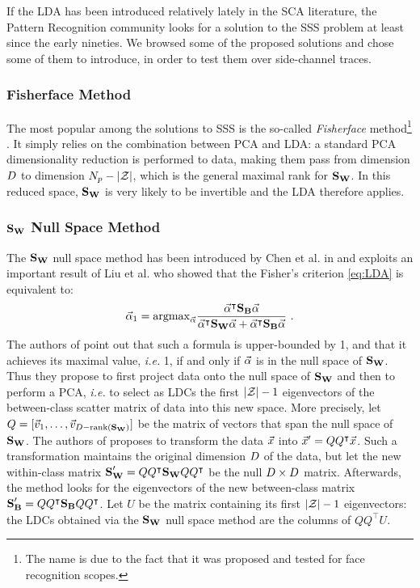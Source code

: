 If the LDA has been introduced relatively lately in the SCA literature, the Pattern Recognition community looks for a solution to the SSS problem at least since the early nineties. We browsed some of the proposed solutions and chose some of them to introduce, in order to test them over side-channel traces.

\subsubsection{Fisherface Method}
The most popular among the solutions to SSS is the so-called {\em Fisherface} method\footnote{The name is due to the fact that it was proposed and tested for face recognition scopes.} \cite{eigenfaces}. It simply relies on the combination between PCA and LDA: a standard PCA dimensionality reduction is performed to data, making them pass from dimension $D$ to dimension $N_p-\lvert\mathcal{Z}\rvert$, which is the general maximal rank for $\textbf{S}_{\textbf{W}}$. In this reduced space, $\textbf{S}_{\textbf{W}}$ is very likely to be invertible and the LDA therefore applies.

\subsubsection{$\textbf{S}_{\textbf{W}}$ Null Space Method}
The $\textbf{S}_{\textbf{W}}$ null space method has been introduced by Chen et al. in \cite{Chen2000} and exploits an important result of Liu et al. \cite{liu1992generalized} who showed that the Fisher's criterion \eqref{eq:LDA} is equivalent to:
 \begin{equation}
 \vec{\alpha}_1=\mathrm{argmax}_{\vec{\alpha}} \frac{\vec{\alpha}^\intercal \textbf{S}_{\textbf{B}} \vec{\alpha}}{\vec{\alpha}^\intercal \textbf{S}_{\textbf{W}} \vec{\alpha} + \vec{\alpha}^\intercal \textbf{S}_{\textbf{B}} \vec{\alpha}} \mbox{ .}
 \end{equation}
The authors of \cite{Chen2000} point out that such a formula is upper-bounded by 1, and that it achieves its maximal value, \textit{i.e.} 1, if and only if  $\vec{\alpha}$ is in the null space of $\textbf{S}_{\textbf{W}}$. Thus they propose to first project data onto the null space of $\textbf{S}_{\textbf{W}}$ and then to perform a PCA, \textit{i.e.} to select as LDCs the first $\lvert\mathcal{Z}\rvert - 1$ eigenvectors of the between-class scatter matrix of data into this new space. More precisely, let $Q = [\vec{v}_1, \dots, \vec{v}_{D - \mathrm{rank}(\textbf{S}_{\textbf{W}})}]$ be the matrix of vectors that span the null space of $\textbf{S}_{\textbf{W}}$. The authors of \cite{Chen2000} proposes to transform the data $\vec{x}$ into $\vec{x}^\prime = QQ^\intercal\vec{x}$. Such a transformation maintains the original dimension $D$ of the data, but let the new within-class matrix $\textbf{S}_{\textbf{W}}' = QQ^\intercal\textbf{S}_{\textbf{W}} QQ^\intercal$ be the null $D \times D$ matrix. Afterwards, the method looks for the eigenvectors of the new between-class matrix $\textbf{S}_{\textbf{B}}' = QQ^\intercal\textbf{S}_{\textbf{B}} QQ^\intercal$. Let $U$ be the matrix containing its first $\lvert\mathcal{Z}\rvert - 1$ eigenvectors: the LDCs obtained via the $\textbf{S}_{\textbf{W}}$ null space method are the columns of $QQ^\intercal U$.

